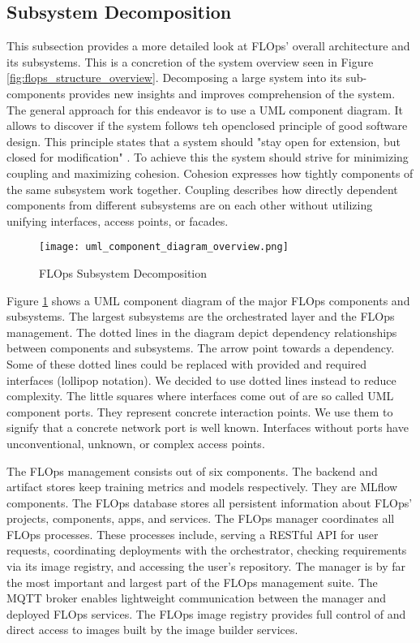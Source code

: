 \subsection{Subsystem Decomposition}
This subsection provides a more detailed look at FLOps' overall architecture and its subsystems.
This is a concretion of the system overview seen in Figure \ref{fig:flops_structure_overview}.
Decomposing a large system into its sub-components provides new insights and improves comprehension of the system.
The general approach for this endeavor is to use a UML component diagram.
It allows to discover if the system follows teh openclosed principle of good software design.
This principle states that a system should "stay open for extension, but closed for modification" \cite{book:bruegge}.
To achieve this the system should strive for minimizing coupling and maximizing cohesion.
Cohesion expresses how tightly components of the same subsystem work together.
Coupling describes how directly dependent components from different subsystems are on each other without utilizing unifying interfaces, access points, or facades.

\begin{figure}[p]
    \begin{adjustwidth}{-0.175\paperwidth}{-0.175\paperwidth}
        \centering
        \texttt{[image: uml\_component\_diagram\_overview.png]}
        \caption{FLOps Subsystem Decomposition}
        \label{fig:component_diagram_overview}
    \end{adjustwidth}
\end{figure}

Figure \ref{fig:component_diagram_overview} shows a UML component diagram of the major FLOps components and subsystems.
The largest subsystems are the orchestrated layer and the FLOps management.
The dotted lines in the diagram depict dependency relationships between components and subsystems.
The arrow point towards a dependency.
Some of these dotted lines could be replaced with provided and required interfaces (lollipop notation).
We decided to use dotted lines instead to reduce complexity.
The little squares where interfaces come out of are so called UML component ports.
They represent concrete interaction points.
We use them to signify that a concrete network port is well known.
Interfaces without ports have unconventional, unknown, or complex access points.

The FLOps management consists out of six components.
The backend and artifact stores keep training metrics and models respectively.
They are MLflow components.
The FLOps database stores all persistent information about FLOps' projects, components, apps, and services.
The FLOps manager coordinates all FLOps processes.
These processes include, serving a RESTful API for user requests, coordinating deployments with the orchestrator, checking requirements via its image registry, and accessing the user's repository.
The manager is by far the most important and largest part of the FLOps management suite.
The MQTT broker enables lightweight communication between the manager and deployed FLOps services.
The FLOps image registry provides full control of and direct access to images built by the image builder services.

